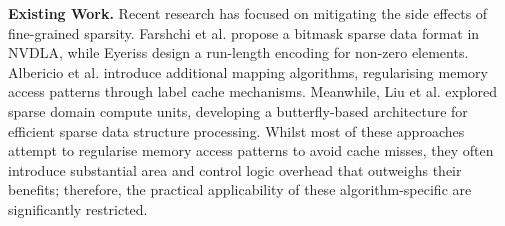 



\noindent \textbf{Existing Work.}
Recent research has focused on mitigating the side effects of fine-grained sparsity.
Farshchi et al.\cite{farshchi2019integrating} propose a bitmask sparse data format in NVDLA, while %
Eyeriss \cite{chen2016eyeriss} design a run-length encoding for non-zero elements. 
Albericio et al.\cite{albericio2016cnvlutin} introduce additional mapping algorithms, regularising memory access patterns through label cache mechanisms. 
Meanwhile, Liu\cite{liu202316} et al. explored sparse domain compute units, developing a butterfly-based architecture for efficient sparse data structure processing.
Whilst most of these approaches attempt to regularise memory access patterns to avoid cache misses, they often introduce substantial area and control logic overhead that outweighs their benefits; therefore, the practical applicability of these algorithm-specific are significantly restricted.






